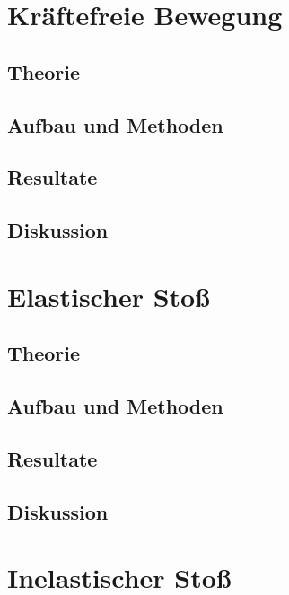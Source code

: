 \documentclass[12pt,a4paper]{article}
\begin{document}
\begin{multicols}{2}
\section{Kräftefreie Bewegung}

\subsection{Theorie}

\subsection{Aufbau und Methoden}

\subsection{Resultate}

\subsection{Diskussion}


\section{Elastischer Stoß}

\subsection{Theorie}

\subsection{Aufbau und Methoden}

\subsection{Resultate}

\subsection{Diskussion}



\section{Inelastischer Stoß}


\end{multicols}
\end{document}
